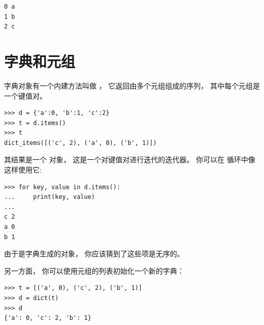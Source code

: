 {\begin{lstlisting}
0 a
1 b
2 c
\end{lstlisting}

%
        


\section{字典和元组}
\label{dictuple}
 
 


字典对象有一个内建方法叫做 \href{https://docs.python.org/3/library/stdtypes.html?highlight=items#dict.items}{  }， 它返回由多个元组组成的序列， 其中每个元组是一个键值对。

\begin{lstlisting}
>>> d = {'a':0, 'b':1, 'c':2}
>>> t = d.items()
>>> t
dict_items([('c', 2), ('a', 0), ('b', 1)])
\end{lstlisting}

%

其结果是一个  对象， 这是一个对键值对进行迭代的迭代器。
你可以在  循环中像这样使用它:

\begin{lstlisting}
>>> for key, value in d.items():
...     print(key, value)
...
c 2
a 0
b 1
\end{lstlisting}

%

由于是字典生成的对象， 你应该猜到了这些项是无序的。


另一方面， 你可以使用元组的列表初始化一个新的字典：

\begin{lstlisting}
>>> t = [('a', 0), ('c', 2), ('b', 1)]
>>> d = dict(t)
>>> d
{'a': 0, 'c': 2, 'b': 1}
\end{lstlisting}

}
